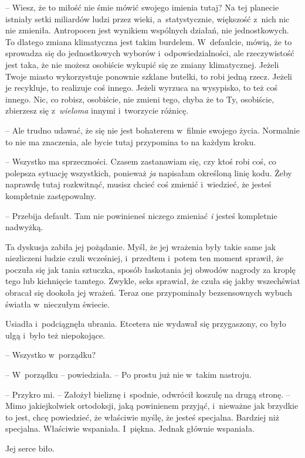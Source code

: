 \documentclass[oneside,polish,11pt,sfheadings]{mwbk}
\begin{document}
-- Wiesz, że to miłość nie śmie mówić swojego imienia tutaj? Na tej
planecie istniały setki miliardów ludzi przez wieki, a~statystycznie,
większość z~nich nic nie zmieniła. Antropocen jest wynikiem wspólnych
działań, nie jednostkowych. To dlatego zmiana klimatyczna jest takim
burdelem. W~defaulcie, mówią, że to sprowadza się do jednostkowych
wyborów i~odpowiedzialności, ale rzeczywistość jest taka, że nie możesz
osobiście wykupić się ze zmiany klimatycznej. Jeżeli Twoje miasto
wykorzystuje ponownie szklane butelki, to robi jedną rzecz. Jeżeli je
recykluje, to realizuje coś innego. Jeżeli wyrzuca na wysypisko, to też
coś innego. Nic, co robisz, osobiście, nie zmieni tego, chyba że to Ty,
osobiście, zbierzesz się z~\textit{wieloma} innymi i~tworzycie różnicę.

-- Ale trudno udawać, że się nie jest bohaterem w~filmie swojego życia.
Normalnie to nie ma znaczenia, ale bycie tutaj przypomina to na każdym
kroku.

-- Wszystko ma sprzeczności. Czasem zastanawiam się, czy ktoś robi coś,
co polepsza sytuację wszystkich, ponieważ \textit{ja} napisałam określoną
linię kodu. Żeby naprawdę tutaj rozkwitnąć, musisz chcieć coś zmienić i~wiedzieć, że jesteś kompletnie zastępowalny.

-- Przebija default. Tam nie powinieneś niczego zmieniać \textit{i} jesteś
kompletnie nadwyżką.

Ta dyskusja zabiła jej pożądanie. Myśl, że jej wrażenia były takie same
jak niezliczeni ludzie czuli wcześniej, i~przedtem i~potem ten moment
sprawił, że poczuła się jak tania sztuczka, sposób łaskotania jej
obwodów nagrody za kroplę tego lub kichnięcie tamtego. Zwykle, seks
sprawiał, że czuła się jakby wszechświat obracał się dookoła jej wrażeń.
Teraz one przypominały bezsensownych wybuch światła w~nieczułym świecie.

Usiadła i~podciągnęła ubrania. Etcetera nie wydawał się przygaszony, co
było ulgą i~było też niepokojące.

-- Wszystko w~porządku?

-- W~porządku -- powiedziała. -- Po prostu już nie w~takim nastroju.

-- Przykro mi. -- Założył bieliznę i~spodnie, odwrócił koszulę na drugą
stronę. -- Mimo jakiejkolwiek ortodoksji, jaką powinienem przyjąć, i~nieważne jak brzydkie to jest, chcę powiedzieć, że właściwie myślę, że
jesteś specjalna. Bardziej niż specjalna. Właściwie wspaniała. I~piękna.
Jednak głównie wspaniała.

Jej serce biło. 
\end{document}
